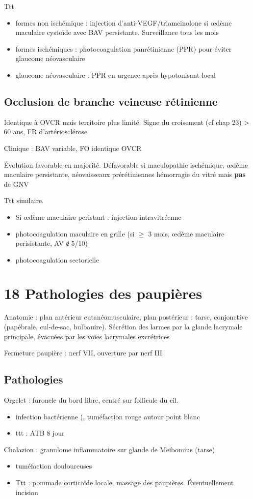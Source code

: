 \documentclass[11pt]{article}
\begin{document}
Ttt 
\begin{itemize}
\item formes non ischémique : injection d'anti-VEGF/triamcinolone si \oe{}dème
maculaire cystoïde avec BAV persistante. Surveillance tous les mois
\item formes ischémiques : photocoagulation panrétinienne (PPR) pour éviter glaucome
néovasculaire
\item glaucome néovasculaire : PPR en urgence après hypotonisant local \danger
\end{itemize}


\subsection{Occlusion de branche veineuse rétinienne}
\label{sec:orgbc04b2d}
Identique à OVCR mais territoire plus limité.
Signe du croisement (cf chap 23) \thus > 60 ans, FR d'artériosclérose

Clinique : BAV variable, FO identique OVCR

Évolution favorable en majorité. Défavorable si maculopathie ischémique,
\oe{}dème maculaire persistante, néovaisseaux prérétiniennes \thus hémorragie du
vitré mais \textbf{pas} de GNV

Ttt similaire. 
\begin{itemize}
\item Si \oe{}dème maculaire peristant : injection intravitréenne
\item photocoagulation maculaire en grille (si \(\ge\) 3 mois, \oe{}dème maculaire
perisistante, AV ɇ 5/10)
\item photocoagulation sectorielle
\end{itemize}
\section{18 Pathologies des paupières}
\label{sec:orgb3b9d65}
Anatomie : plan antérieur cutanéomusculaire, plan postérieur : tarse,
conjonctive (papébrale, cul-de-sac, bulbauire). Sécrétion des larmes par la
glande lacrymale principale, évacuées par les voies lacrymales excrétrices

Fermeture paupière : nerf VII, ouverture par nerf III

\subsection{Pathologies}
\label{sec:orgaeb9ad2}
Orgelet : furoncle du bord libre, centré sur follicule du cil.
\begin{itemize}
\item infection bactérienne (, tuméfaction rouge autour point blanc
\item ttt : ATB 8 jour
\end{itemize}
Chalazion : granulome inflammatoire sur glande de Meibomius (tarse)
\begin{itemize}
\item tuméfaction douloureuses
\item Ttt : pommade corticoïde locale, massage des paupières. Éventuellement
incision
\end{itemize}
\end{document}
